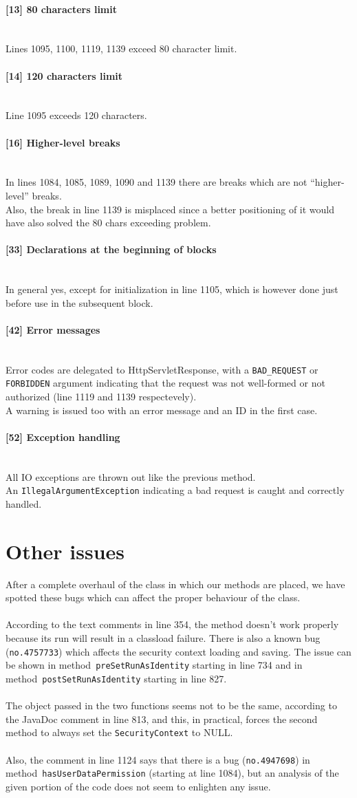 \documentclass[a4paper, 11pt]{article}
\newcommand{\code}[1]{\texttt{#1}}
\newcommand{\issue}[3][?]{
    \paragraph{[#1] #2} \mbox{}\\ #3
}
\begin{document}
\issue[13]{80 characters limit}{
    Lines 1095, 1100, 1119, 1139 exceed 80 character limit.
}

\issue[14]{120 characters limit} {
    Line 1095 exceeds 120 characters.
}

\issue[16]{Higher-level breaks} {
In lines 1084, 1085, 1089, 1090 and 1139 there are breaks which are not
``higher-level''  breaks. \\
Also, the break in line 1139 is misplaced since a better positioning of it 
would have also solved the 80 chars exceeding problem.
}

\issue[33]{Declarations at the beginning of blocks} {
In general yes, except for initialization in line 1105, which is however done 
just before use in the subsequent block.
}

\issue[42]{Error messages} {
Error codes are delegated to HttpServletResponse, with a \code{BAD\_REQUEST}
or \code{FORBIDDEN} argument indicating that the request was not well-formed 
or not authorized (line 1119 and 1139 respectevely). \\ 
A warning is issued too with an error message and an ID in the first case.
}

\issue[52]{Exception handling} {
All IO exceptions are thrown out like the previous method. \\
An \code{IllegalArgumentException} indicating a bad request is caught 
and correctly handled.
}


\newpage
\section{Other issues}

After a complete overhaul of the class in which our methods are placed, we have
spotted these bugs which can affect the proper behaviour of the class. \\ \\
According to the text comments in line 354, the method doesn't work properly 
because its run will result in a classload failure.
There is also a known bug (\texttt{no.4757733}) which affects the security 
context loading and saving. The issue can be shown in 
method~\texttt{preSetRunAsIdentity} starting in line 734 and in
method~\texttt{postSetRunAsIdentity} starting in line 827. \\ \\
The object passed in the two functions seems not to be the same, according to 
the JavaDoc comment in line 813, and this, in practical, forces the second 
method to always set the \texttt{SecurityContext} to NULL. \\ \\
Also, the comment in line 1124 says that there is a bug (\texttt{no.4947698}) 
in method~\texttt{hasUserDataPermission} (starting at line 1084),   
but an analysis of the given portion of the code does not seem 
to enlighten any issue.
\end{document}
